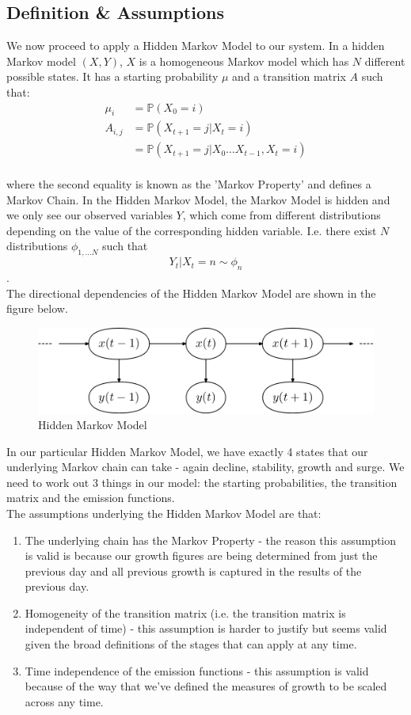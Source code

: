 \documentclass[12pt]{article}
\newcommand{\Prob}{\mathbb{P}}
\begin{document}
\subsection{Definition \& Assumptions}
We now proceed to apply a Hidden Markov Model to our system. In a hidden Markov model $(X,Y)$, $X$ is a homogeneous Markov model which has $N$ different possible states. It has a starting probability $\mu$ and a transition matrix $A$ such that:
\begin{align*}
\mu_i &= \Prob(X_0=i)\\
A_{i,j} &= \Prob (X_{t+1} = j \vert X_t = i)\\ 
&= \Prob(X_{t+1} = j \vert X_0\ldots X_{t-1},X_t = i)
\end{align*}\\
where the second equality is known as the 'Markov Property' and defines a Markov Chain. In the Hidden Markov Model, the Markov Model is hidden and we only see our observed variables $Y$, which come from different distributions depending on the value of the corresponding hidden variable. I.e. there exist $N$ distributions $\phi_{1,\ldots N}$ such that $$ Y_t \vert X_t = n \sim \phi_n$$. \\The directional dependencies of the Hidden Markov Model are shown in the figure below.
\FloatBarrier
\begin{figure}[hbtp]\centering
\caption{Hidden Markov Model}
\includegraphics[width=\textwidth,clip]{MarkovChainExplanation.png}
\end{figure}
\FloatBarrier

In our particular Hidden Markov Model, we have exactly 4 states that our underlying Markov chain can take - again decline, stability, growth and surge. We need to work out 3 things in our model: the starting probabilities, the transition matrix and the emission functions. 
\\
The assumptions underlying the Hidden Markov Model are that:
\begin{enumerate}
\item The underlying chain has the Markov Property - the reason this assumption is valid is because our growth figures are being determined from just the previous day and all previous growth is captured in the results of the previous day.
\item Homogeneity of the transition matrix (i.e. the transition matrix is independent of time) - this assumption is harder to justify but seems valid given the broad definitions of the stages that can apply at any time.
\item Time independence of the emission functions - this assumption is valid because of the way that we've defined the measures of growth to be scaled across any time.
\end{enumerate}
\end{document}

